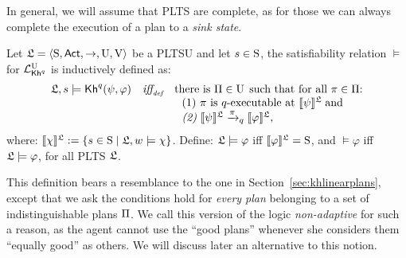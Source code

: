In general, we will assume that PLTS are complete, as for those we can always complete the execution of a plan to a \emph{sink state}.


\begin{definition} \label{def:semantics-non-adap}
    Let $\model = \tup{\S,\ACT,\ra,\Unc,\V}$ be a PLTSU and let $s\in\S$, the satisfiability relation $\models$ for $\PKhunc$ is inductively defined as:
    \[
    \begin{array}{l@{\ \ \ }c@{\ \ \  }l}
    \model, s \models \kh^q(\psi,\varphi) & \iffdef & \text{there is } \plans \in \Unc \;\text{such that for all } \plan\in\plans{:} \\
    & & \ \ \text{\rm (1)} \ \plan \text{ is $q$-executable at }  \truthset{\model}{\psi}\; \text{and} \\
    & & \ \ \text{\em (2)} \ \truthset{\model}{\psi} \reach{\plan}_q \truthset{\model}{\varphi}, 
    \end{array}
    \]     
    \noindent where: $\truthset{\model}{\chi} := \csetsc{s\in\S}{\model,w\models\chi}$. Define: $\model\models\varphi$ iff  $\truthset{\model}{\varphi}=\S$, and $\models\varphi$ iff $\model\models\varphi$, for all PLTS $\model$.
\end{definition}

This definition bears a resemblance to the one in Section~\ref{sec:khlinearplans}, except that we ask the conditions hold for \emph{every plan} belonging to a set of indistinguishable plans $\plans$. We call this version of the logic \emph{non-adaptive} for such a reason, as the agent cannot use the ``good plans'' whenever she considers them ``equally good'' as others.  We will discuss later an alternative to this notion.

